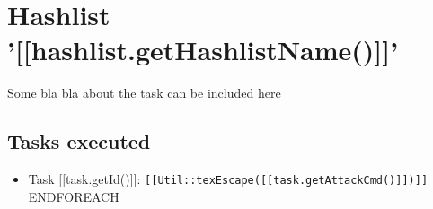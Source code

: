 \documentclass[12pt]{article}
\begin{document}
\section*{Hashlist '[[hashlist.getHashlistName()]]'}

Some bla bla about the task can be included here

\subsection*{Tasks executed}

\begin{itemize}
{{FOREACH task;[[tasks]]}}
	\item Task [[task.getId()]]: \texttt{[[Util::texEscape([[task.getAttackCmd()]])]]}
{{ENDFOREACH}}
\end{itemize}
\end{document}
